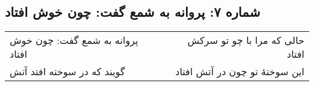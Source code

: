 \begin{center}
\section*{شماره ۷: پروانه به شمع گفت: چون خوش افتاد}
\label{sec:007}
\begin{longtable}{l p{0.5cm} r}
پروانه به شمع گفت: چون خوش افتاد
&&
حالی که مرا با چو تو سرکش افتاد
\\
گویند که در سوخته افتد آتش
&&
این سوختهٔ تو چون در آتش افتاد
\\
\end{longtable}
\end{center}
